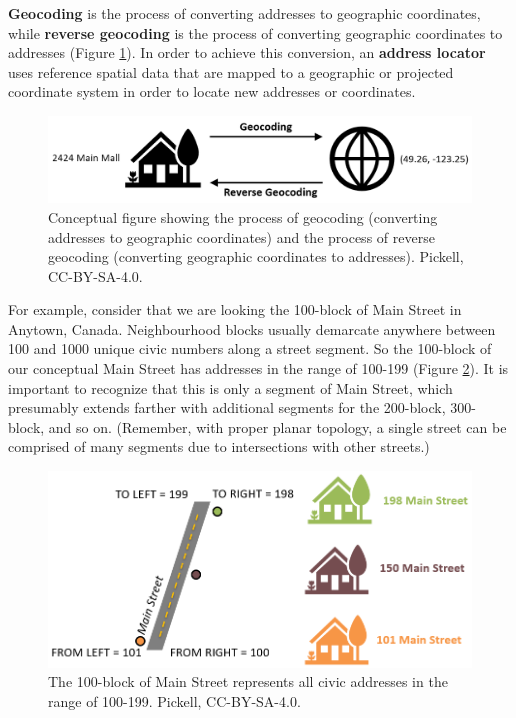 \documentclass[
]{book}
\begin{document}
\textbf{Geocoding} is the process of converting addresses to geographic coordinates, while \textbf{reverse geocoding} is the process of converting geographic coordinates to addresses (Figure \ref{fig:7-geocoding}). In order to achieve this conversion, an \textbf{address locator} uses reference spatial data that are mapped to a geographic or projected coordinate system in order to locate new addresses or coordinates.

\begin{figure}
\includegraphics[width=0.75\linewidth]{images/07-geocoding} \caption{Conceptual figure showing the process of geocoding (converting addresses to geographic coordinates) and the process of reverse geocoding (converting geographic coordinates to addresses). Pickell, CC-BY-SA-4.0.}\label{fig:7-geocoding}
\end{figure}

For example, consider that we are looking the 100-block of Main Street in Anytown, Canada. Neighbourhood blocks usually demarcate anywhere between 100 and 1000 unique civic numbers along a street segment. So the 100-block of our conceptual Main Street has addresses in the range of 100-199 (Figure \ref{fig:7-left-right-side}). It is important to recognize that this is only a segment of Main Street, which presumably extends farther with additional segments for the 200-block, 300-block, and so on. (Remember, with proper planar topology, a single street can be comprised of many segments due to intersections with other streets.)

\begin{figure}
\includegraphics[width=0.75\linewidth]{images/07-left-right-side} \caption{The 100-block of Main Street represents all civic addresses in the range of 100-199. Pickell, CC-BY-SA-4.0.}\label{fig:7-left-right-side}
\end{figure}
\end{document}
